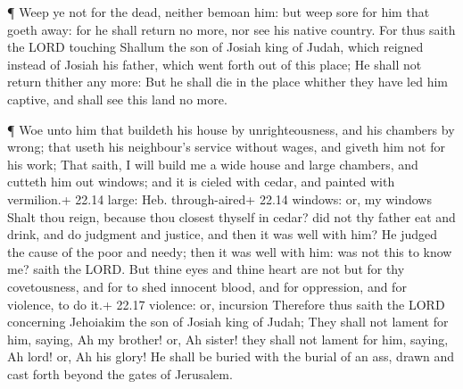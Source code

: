  ¶ Weep ye not for the dead, neither bemoan him: but weep
sore for him that goeth away: for he shall return no more, nor see his
native country.  For thus saith the LORD touching Shallum
the son of Josiah king of Judah, which reigned instead of Josiah his
father, which went forth out of this place; He shall not return thither
any more:  But he shall die in the place whither they have
led him captive, and shall see this land no more.

 ¶ Woe unto him that buildeth his house by unrighteousness,
and his chambers by wrong; that useth his neighbour's service without
wages, and giveth him not for his work;  That saith, I will
build me a wide house and large chambers, and cutteth him out windows;
and it is cieled with cedar, and painted with vermilion.+ 22.14 large:
Heb. through-aired+ 22.14 windows: or, my windows  Shalt
thou reign, because thou closest thyself in cedar? did not thy father
eat and drink, and do judgment and justice, and then it was well with
him?  He judged the cause of the poor and needy; then it
was well with him: was not this to know me? saith the LORD.
 But thine eyes and thine heart are not but for thy
covetousness, and for to shed innocent blood, and for oppression, and
for violence, to do it.+ 22.17 violence: or, incursion 
Therefore thus saith the LORD concerning Jehoiakim the son of Josiah
king of Judah; They shall not lament for him, saying, Ah my brother! or,
Ah sister! they shall not lament for him, saying, Ah lord! or, Ah his
glory!  He shall be buried with the burial of an ass, drawn
and cast forth beyond the gates of Jerusalem.

